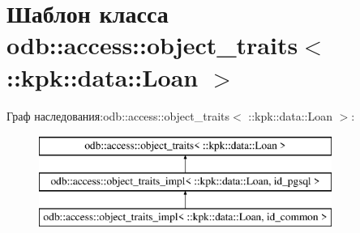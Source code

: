 \hypertarget{classodb_1_1access_1_1object__traits_3_01_1_1kpk_1_1data_1_1_loan_01_4}{}\section{Шаблон класса odb\+:\+:access\+:\+:object\+\_\+traits$<$ \+:\+:kpk\+:\+:data\+:\+:Loan $>$}
\label{classodb_1_1access_1_1object__traits_3_01_1_1kpk_1_1data_1_1_loan_01_4}
Граф наследования\+:odb\+:\+:access\+:\+:object\+\_\+traits$<$ \+:\+:kpk\+:\+:data\+:\+:Loan $>$\+:\begin{figure}[H]
\begin{center}
\leavevmode
\includegraphics[height=3.000000cm]{classodb_1_1access_1_1object__traits_3_01_1_1kpk_1_1data_1_1_loan_01_4}
\end{center}
\end{figure}
